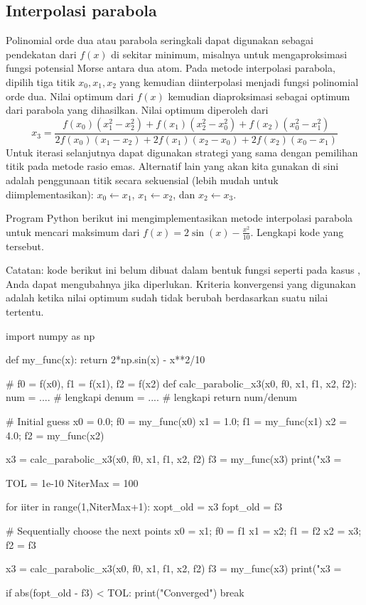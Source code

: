 \subsection{Interpolasi parabola}

Polinomial orde dua atau parabola seringkali dapat digunakan sebagai pendekatan
dari $f(x)$ di sekitar minimum, misalnya untuk mengaproksimasi fungsi potensial Morse
antara dua atom.
Pada metode interpolasi parabola, dipilih tiga titik $x_0, x_1, x_2$
yang kemudian diinterpolasi menjadi
fungsi polinomial orde dua. Nilai optimum dari $f(x)$ kemudian diaproksimasi sebagai
optimum dari parabola yang dihasilkan. Nilai optimum diperoleh dari
\begin{equation}
x_3 = \frac{f(x_0)(x_{1}^2 - x_{2}^2) + f(x_1)(x_{2}^2 - x_{0}^2) + f(x_2)(x_{0}^2 - x_{1}^2)}%
{2f(x_0)(x_{1} - x_{2}) + 2f(x_1)(x_{2} - x_{0}) + 2f(x_2)(x_{0} - x_{1})}
\end{equation}
Untuk iterasi selanjutnya dapat digunakan strategi yang sama dengan pemilihan titik pada
metode rasio emas. Alternatif lain yang akan kita gunakan di sini adalah
penggunaan titik secara sekuensial (lebih mudah untuk diimplementasikan):
$x_0 \leftarrow x_1$, $x_1 \leftarrow x_2$, dan $x_2 \leftarrow x_3$.

\begin{soal}
Program Python berikut ini mengimplementasikan metode interpolasi parabola untuk
mencari maksimum dari $f(x) = 2\sin(x) - \frac{x^2}{10}$. Lengkapi kode yang tersebut.
\end{soal}

Catatan: kode berikut ini belum dibuat dalam bentuk fungsi seperti pada kasus
, Anda dapat mengubahnya jika diperlukan.
Kriteria konvergensi yang digunakan adalah ketika nilai optimum sudah tidak berubah
berdasarkan suatu nilai tertentu.

\begin{pythoncode}
import numpy as np

def my_func(x):
    return 2*np.sin(x) - x**2/10

# f0 = f(x0), f1 = f(x1), f2 = f(x2)
def calc_parabolic_x3(x0, f0, x1, f1, x2, f2):
    num = ....  # lengkapi
    denum = .... # lengkapi
    return num/denum

# Initial guess
x0 = 0.0; f0 = my_func(x0)
x1 = 1.0; f1 = my_func(x1)
x2 = 4.0; f2 = my_func(x2)

x3 = calc_parabolic_x3(x0, f0, x1, f1, x2, f2)
f3 = my_func(x3)
print("x3 = %

TOL = 1e-10
NiterMax = 100

for iiter in range(1,NiterMax+1):
    xopt_old = x3
    fopt_old = f3

    # Sequentially choose the next points
    x0 = x1; f0 = f1
    x1 = x2; f1 = f2
    x2 = x3; f2 = f3

    x3 = calc_parabolic_x3(x0, f0, x1, f1, x2, f2)
    f3 = my_func(x3)
    print("x3 = %

    if abs(fopt_old - f3) < TOL:
        print("Converged")
        break
\end{pythoncode}

